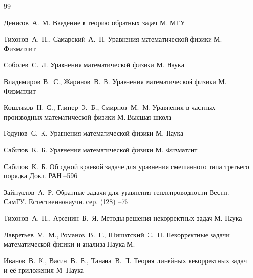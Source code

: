 \newpage

\RusRef


\begin{thebibliography}{99}

\by  Денисов~А.~М.
\book Введение в теорию обратных задач
\publaddr М.
\publ МГУ

\by  Тихонов~А.~Н., Самарский~А.~Н.
\book Уравнения математической физики
\publaddr М.
\publ Физматлит

\by  Соболев~С.~Л.
\book Уравнения математической физики
\publaddr М.
\publ Наука

\by Владимиров~В.~С., Жаринов~В.~В.
\book Уравнения математической физики
\publaddr М.
\publ Физматлит

\by Кошляков~Н.~С., Глинер~Э.~Б., Смирнов~М.~М.
\book Уравнения в частных производных математической физики
\publaddr М.
\publ Высшая школа

\by Годунов~С.~К.
\book Уравнения математической физики
\publaddr М.
\publ Наука

\by Сабитов~К.~Б.
\book Уравнения математической физики
\publaddr М.
\publ Физматлит



\by Сабитов~К.~Б.
\paper Об одной краевой задаче для уравнения смешанного типа третьего порядка
\jour Докл. РАН
--596





\by Зайнуллов~А.~Р.
\paper Обратные задачи для уравнения теплопроводности
\jour Вестн. СамГУ. Естественнонаучн. сер.
(128)
--75


\by Тихонов~А.~Н., Арсенин~В.~Я.
\book Методы решения некорректных задач 
\publaddr   М.
\publ Наука

\by Лавретьев~М.~М., Романов~В.~Г., Шишатский~С.~П.
\book Некорректные задачи математической физики и анализа
\publ Наука
\publaddr М.

\by Иванов~В.~К., Васин~В.~В., Танана~В.~П.
\book Теория линейных некорректных задач и её приложения
\publaddr М.
\publ Наука


\end{thebibliography}

